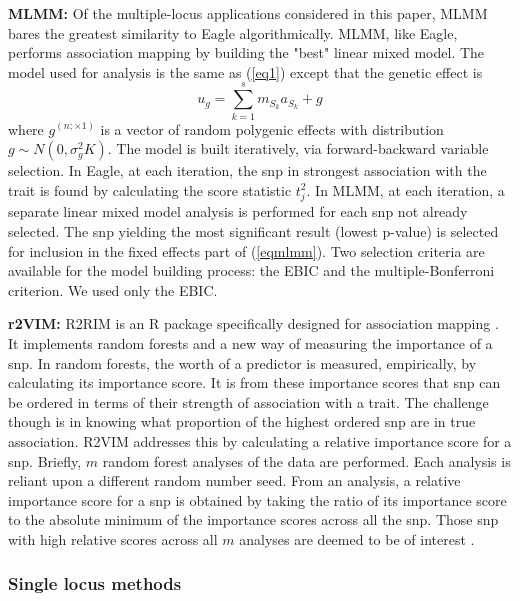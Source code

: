 \documentclass{nature}
\begin{document}
\textbf{MLMM:}  Of the multiple-locus applications considered in this paper, 
MLMM bares the greatest similarity to Eagle algorithmically.  MLMM, like Eagle, performs 
association mapping by building the "best" linear mixed model.  The model used for analysis 
is the same as (\ref{eq1}) except that the genetic effect is 
\begin{equation}
\label{eqmlmm}
u_g = \sum_{k=1}^s  m_{S_k} a_{S_k} + g
\end{equation}
where 
$g^{(n ; \times 1)}$ is a vector of random polygenic effects with distribution 
$g \sim N(0, \sigma^2_g K)$. The model is built iteratively, via forward-backward variable selection.  In Eagle, at each iteration, 
the snp in strongest association with the trait is found by calculating the score statistic $t_j^2$.  In MLMM, at each iteration, 
a separate linear mixed model analysis is performed for each snp not already selected. The snp yielding the most 
significant result (lowest p-value) is selected for inclusion in the fixed effects part of (\ref{eqmlmm}).  
Two selection 
criteria are available for the model building process: 
the EBIC and the multiple-Bonferroni criterion. We used only the EBIC. 

\textbf{r2VIM:} R2RIM is an R package specifically designed for association mapping \cite{szymczak2016r2vim}. 
It implements random forests and a new way of measuring the importance of a snp.  In random forests, the worth of a predictor is measured, empirically, by calculating its importance score. It is from these importance scores that snp can be ordered in terms of their strength of association with a trait. The challenge though is in knowing what proportion of the 
highest ordered snp are in true association. R2VIM addresses this by calculating a relative importance score for a snp. Briefly,
$m$ random forest analyses of the data are performed. Each analysis is reliant upon a different random number seed. 
From an analysis, a relative importance score for a snp is obtained by taking the ratio of its importance score to the absolute 
minimum of the importance scores across all the snp.  Those 
snp with high relative scores across all $m$ analyses are deemed to be of interest \cite{szymczak2016r2vim}.

  
  


\subsubsection{Single locus methods}
\end{document}
